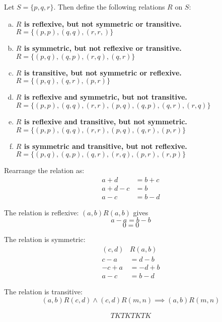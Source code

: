 \documentclass[12pt]{scrartcl} %
\begin{document}
Let $S = \{p, q, r\}$. Then define the following relations $R$ on $S$:
\begin{enumerate}[(a)]
\item \textbf{$R$ is reflexive, but not symmetric or transitive.} \\ $R = \{(p,p),(q,q),(r,r,)\}$
\item \textbf{$R$ is symmetric, but not reflexive or transitive.} \\ $R = \{(p,q), (q,p), (r,q), (q,r)\}$
\item \textbf{$R$ is transitive, but not symmetric or reflexive.} \\ $R = \{(p,q), (q,r), (p,r)\}$
\item \textbf{$R$ is reflexive and symmetric, but not transitive.} \\ $R = \{(p,p), (q,q), (r,r), (p,q), (q,p), (q,r), (r,q)\}$
\item \textbf{$R$ is reflexive and transitive, but not symmetric.} \\ $R = \{(p,p), (q,q), (r,r), (p,q), (q,r), (p,r)\}$
\item \textbf{$R$ is symmetric and transitive, but not reflexive.} \\ $R = \{(p, q), (q, p), (q, r), (r, q), (p, r), (r, p)\}$
\end{enumerate}


Rearrange the relation as:
\begin{align*}
a+d &= b+c \\
a+d-c &= b \\
a-c &= b-d
\end{align*}

The relation is reflexive: $(a,b)R(a,b)$ gives
$$ a-a = b-b $$
$$ 0 = 0 $$

The relation is symmetric:
\begin{align*}
(c,d) &R (a,b) \\
c-a &= d-b \\
-c+a &= -d+b  \\
a-c &= b-d
\end{align*}

The relation is transitive:
$$(a,b)R(c,d) \land (c,d)R(m,n) \implies (a,b)R(m,n)$$

\begin{align*}
TK TK TK TK
\end{align*}
\end{document}
